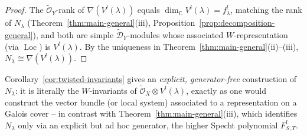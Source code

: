 \documentclass[11pt,a4paper]{article}
\begin{document}
\begin{proof}
The $\widetilde{\mathcal{O}}_Y$-rank of
$\nabla(V^l(\lambda))$ equals $\dim_{\mathbb{C}} V^l(\lambda) = f^l_\lambda$,
matching the rank of $N_\lambda$ (Theorem~\ref{thm:main-general}(iii),
Proposition~\ref{prop:decomposition-general}), and both are simple
$\widetilde{\mathcal{D}}_Y$-modules whose associated $W$-representation
(via $\operatorname{Loc}$) is $V^l(\lambda)$. By the uniqueness in
Theorem~\ref{thm:main-general}(ii)--(iii), $N_\lambda \cong \nabla(V^l(\lambda))$.
\end{proof}

Corollary~\ref{cor:twisted-invariants} gives an \emph{explicit,
generator-free} construction of $N_\lambda$: it is literally the
$W$-invariants of $\widetilde{\mathcal{O}}_X \otimes V^l(\lambda)$,
exactly as one would construct the vector bundle (or local system)
associated to a representation on a Galois cover -- in contrast with
Theorem~\ref{thm:main-general}(iii), which identifies $N_\lambda$ only
via an explicit but ad hoc generator, the higher Specht polynomial
$F^l_{S,T}$.
\end{document}
